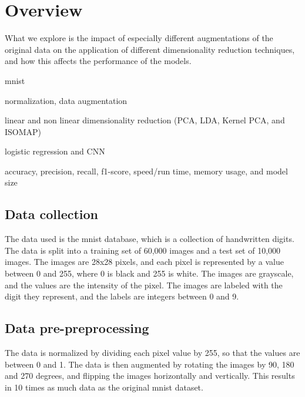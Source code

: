 

\section{Overview}\label{sec:overview}
What we explore is the impact of especially different augmentations of the original data on the application of different dimensionality reduction techniques, and how this affects the performance of the models.


\begin{description}
    \setlength\itemsep{0em}
    \item[dataset] mnist
    \item[pre-preprocessing] normalization, data augmentation
    \item[preprocessing] linear and non linear dimensionality reduction (PCA, LDA, Kernel PCA, and ISOMAP)
    \item[models] logistic regression and CNN
    \item[evaluation] accuracy, precision, recall, f1-score, speed/run time, memory usage, and model size
\end{description}


\subsection{Data collection}\label{subsec:data-collection}
The data used is the \gls{mnist} database, which is a collection of handwritten digits. The data is split into a training set of 60,000 images and a test set of 10,000 images. The images are 28x28 pixels, and each pixel is represented by a value between 0 and 255, where 0 is black and 255 is white. The images are grayscale, and the values are the intensity of the pixel. The images are labeled with the digit they represent, and the labels are integers between 0 and 9.

\subsection{Data pre-preprocessing}\label{subsec:data-pre-preprocessing}
The data is normalized by dividing each pixel value by 255, so that the values are between 0 and 1. The data is then augmented by rotating the images by 90, 180 and 270 degrees, and flipping the images horizontally and vertically. This results in 10 times as much data as the original \gls{mnist} dataset.

